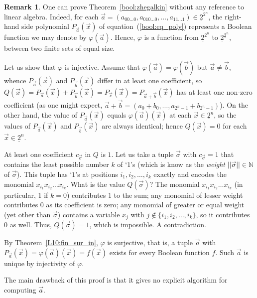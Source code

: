 \documentclass[12pt,notitlepage]{article}
\theoremstyle{plain}
\theoremstyle{definition}
\newtheorem{rem}[thm]{Remark}
\theoremstyle{plain}
\newcommand{\N}{\mathbb{N}}
\renewcommand{\phi}{\varphi}
\newcommand{\ul}[1]{\underline{#1}}
\newcommand{\1}{\mathbf{1}}
\newcommand{\0}{\mathbf{0}}
\begin{document}
\begin{rem}
One can prove Theorem~\ref{bool:zhegalkin} without any reference to linear algebra. Indeed, for each $\vec a = (a_{00\ldots0}, a_{010\ldots0}, \ldots, a_{11\ldots1}) \in \ul{2}^{2^n}$, the right-hand side polynomial $P_{\vec a}(\vec x)$ of equation~(\ref{bool:eq_poly}) represents a Boolean function we may denote by $\phi(\vec a)$. Hence, $\phi$ is a function from $\ul{2}^{2^n}$ to $\ul{2}^{\ul{2}^n}$, between two finite sets of equal size.

Let us show that $\phi$ is injective. Assume that $\phi(\vec a) = \phi(\vec b)$ but $\vec a \neq \vec b$, whence $P_{\vec a}(\vec x)$ and $P_{\vec b}(\vec x)$ differ in at least one coefficient, so  $Q(\vec x) = P_{\vec a}(\vec x)+ P_{\vec b}(\vec x) = P_{\vec c}(\vec x) = P_{\vec a + \vec b}(\vec x)$ has at least one non-zero coefficient (as one might expect, $\vec a + \vec b = (a_0 + b_0, \ldots, a_{2^n - 1} + b_{2^n - 1})$). On the other hand, the value of $P_{\vec a}(\vec x)$ equals $\phi(\vec a)(\vec x)$ at each $\vec x \in \ul{2}^n$, so the values of $P_{\vec a}(\vec x)$ and $P_{\vec b}(\vec x)$ are always identical; hence $Q(\vec x) = 0$ for each $\vec x \in \ul{2}^n$.

At least one coefficient $c_{\vec \sigma}$ in $Q$ is $1$. Let us take a tuple $\vec \sigma$ with $c_{\vec \sigma} = 1$ that contains the least possible number $k$ of `$1$'s (which is know as the \emph{weight} $||\vec \sigma|| \in \N$ of $\vec\sigma$). This tuple has `$1$'s at positions $i_1, i_2, \ldots, i_k$ exactly and encodes the monomial $x_{i_1} x_{i_2} \ldots x_{i_k}$. What is the value $Q(\vec \sigma)$? The monomial $x_{i_1} x_{i_2} \ldots x_{i_k}$ (in particular, $1$ if $k = 0$) contributes $1$ to the sum; any monomial of lesser weight contributes $0$ as its coefficient is zero; any monomial of greater or equal weight (yet other than $\vec \sigma$) contains a variable $x_j$ with $j \notin \{i_1, i_2, \ldots, i_k \}$, so it contributes $0$ as well. Thus, $Q(\vec \sigma) = 1$, which is impossible. A contradiction.

By Theorem~\ref{L10:fin_sur_in}, $\phi$ is surjective, that is, a tuple $\vec a$ with $P_{\vec a}(\vec x) = \phi(\vec a)(\vec x) = f(\vec x)$ exists for every Boolean function $f$. Such $\vec a$ is unique by injectivity of $\phi$.

The main drawback of this proof is that it gives no explicit algorithm for computing $\vec a$.
\end{rem}

\newpage
\end{document}
